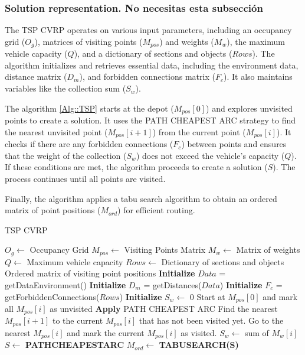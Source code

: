 \documentclass[conference]{IEEEtran}
\begin{document}
\subsubsection{Solution representation. No necesitas esta subsección}
The TSP CVRP operates on various input parameters, including an occupancy grid ($O_{g}$), matrices of visiting points ($M_{pos}$) and weights ($M_{w}$), the maximum vehicle capacity ($Q$), and a dictionary of sections and objects ($Rows$). The algorithm initializes and retrieves essential data, including the environment data, distance matrix ($D_{m}$), and forbidden connections matrix ($F_{c}$). It also maintains variables like the collection sum ($S_{w}$).

The algorithm \ref{Alg::TSP} starts at the depot ($M_{pos}[0]$) and explores unvisited points to create a solution. It uses the PATH CHEAPEST ARC strategy to find the nearest unvisited point ($M_{pos}[i+1]$) from the current point ($M_{pos}[i]$). It checks if there are any forbidden connections ($F_{c}$) between points and ensures that the weight of the collection ($S_{w}$) does not exceed the vehicle's capacity ($Q$). If these conditions are met, the algorithm proceeds to create a solution ($S$). The process continues until all points are visited.

Finally, the algorithm applies a tabu search algorithm to obtain an ordered matrix of point positions ($M_{ord}$) for efficient routing.

\begin{algorithm}[t!]
\caption{TSP CVRP}
\label{Alg::TSP}
\begin{algorithmic}[1]
\Require
\State $O_{g} \gets$ Occupancy Grid
\State $M_{pos} \gets$ Visiting Points Matrix
\State $M_{w} \gets$ Matrix of weights
\State $Q \gets$ Maximum vehicle capacity
\State $Rows \gets$ Dictionary of sections and objects
\Ensure
\State Ordered matrix of visiting point positions
\State \textbf{Initialize} $Data $ = getDataEnvironment() 
\State \textbf{Initialize} $D_{m} $ = getDistances($Data$) 
\State \textbf{Initialize} $F_{c} $ = getForbiddenConnections($Rows$) 
\State \textbf{Initialize} $S_{w} \gets$ 0 
\State Start at $M_{pos}[0]$ and mark all $M_{pos}[i]$ as unvisited
\State \textbf{Apply} PATH CHEAPEST ARC
\State Find the nearest $M_{pos}[i+1]$ to the current $M_{pos}[i]$ that has not been visited yet.
\State Go to the nearest $M_{pos}[i]$ and mark the current $M_{pos}[i]$ as visited.
\State $S_{w} \gets$ sum of $M_{w}[i]$
\State $S \gets$ \textbf{PATHCHEAPESTARC} 
\EndIf
\EndIf
\EndWhile
\State $M_{ord} \gets$  \textbf{TABUSEARCH(S)} 
\end{algorithmic}
\end{algorithm}
\end{document}
